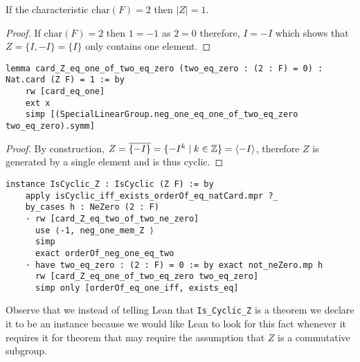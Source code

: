 \begin{lemma}
    \label{SpecialSubgroups.card_Z_eq_one_of_two_eq_zero}
    \leanok
    If the characteristic $\textrm{char}(F) = 2$ then $|Z| = 1$. 
\end{lemma}
\begin{proof}
\leanok
    If $\textrm{char}(F) = 2$ then $1 = -1$ as $2 = 0$ therefore, $I = -I$ which shows that $Z = \{I , -I\} = \{I\}$ only contains one element.
\end{proof}
\begin{footnotesize}
\begin{verbatim}
lemma card_Z_eq_one_of_two_eq_zero (two_eq_zero : (2 : F) = 0) : Nat.card (Z F) = 1 := by
    rw [card_eq_one]
    ext x
    simp [(SpecialLinearGroup.neg_one_eq_one_of_two_eq_zero two_eq_zero).symm]
\end{verbatim}
\end{footnotesize}

\begin{lemma}[$Z$ is cyclic]
    \label{SpecialSubgroups.IsCyclic_Z}
    \leanok
\end{lemma}
\begin{proof}
\leanok
    By construction, $Z = \overline{\{-I\}} = \{-I^k \; | \; k \in \mathbb{Z} \} = \langle -I \rangle$, therefore $Z$ is generated by a single element and is thus cyclic.
\end{proof}
\begin{footnotesize}
\begin{verbatim}
instance IsCyclic_Z : IsCyclic (Z F) := by
    apply isCyclic_iff_exists_orderOf_eq_natCard.mpr ?_
    by_cases h : NeZero (2 : F)
    · rw [card_Z_eq_two_of_two_ne_zero]
      use ⟨-1, neg_one_mem_Z ⟩
      simp
      exact orderOf_neg_one_eq_two
    · have two_eq_zero : (2 : F) = 0 := by exact not_neZero.mp h
      rw [card_Z_eq_one_of_two_eq_zero two_eq_zero]
      simp only [orderOf_eq_one_iff, exists_eq]
\end{verbatim}
\end{footnotesize}

\begin{remark}
    Observe that we instead of telling Lean that \texttt{Is\_Cyclic\_Z} is a theorem we declare it to be
    an instance because we would like Lean to look for this fact whenever it requires it for theorem that may require
    the assumption that $Z$ is a commutative subgroup.
\end{remark}


